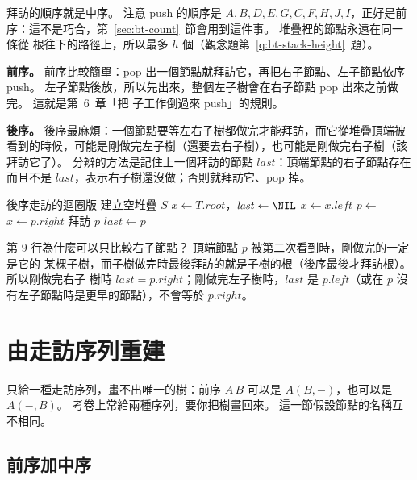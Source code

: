 拜訪的順序就是中序。 注意 push 的順序是 $A, B, D, E, G, C, F, H, J, I$，正好是前
序：這不是巧合，第~\ref{sec:bt-count}~節會用到這件事。 堆疊裡的節點永遠在同一條從
根往下的路徑上，所以最多 $h$ 個（觀念題第~\ref{q:bt-stack-height}~題）。

\textbf{前序。} 前序比較簡單：pop 出一個節點就拜訪它，再把右子節點、左子節點依序 push。
左子節點後放，所以先出來，整個左子樹會在右子節點 pop 出來之前做完。 這就是第~6~章「把
子工作倒過來 push」的規則。

\textbf{後序。} 後序最麻煩：一個節點要等左右子樹都做完才能拜訪，而它從堆疊頂端被
看到的時候，可能是剛做完左子樹（還要去右子樹），也可能是剛做完右子樹（該拜訪它了）。
分辨的方法是記住上一個拜訪的節點 $\mathit{last}$：頂端節點的右子節點存在而且不是
$\mathit{last}$，表示右子樹還沒做；否則就拜訪它、pop 掉。

\begin{pseudo}[label=alg:bt-postorder-iter]{後序走訪的迴圈版}
    \State 建立空堆疊 $S$
    \State $x \gets T.\mathit{root}$，$\mathit{last} \gets \NIL$
            \State {}
            \State $x \gets x.\mathit{left}$
        \EndWhile
        \State $p \gets$  
            \State $x \gets p.\mathit{right}$ 
        \Else
            \State 拜訪 $p$
            \State $\mathit{last} \gets p$
            \State {}
        \EndIf
    \EndWhile
\EndProcedure
\end{pseudo}

第 9 行為什麼可以只比較右子節點？ 頂端節點 $p$ 被第二次看到時，剛做完的一定是它的
某棵子樹，而子樹做完時最後拜訪的就是子樹的根（後序最後才拜訪根）。 所以剛做完右子
樹時 $\mathit{last} = p.\mathit{right}$；剛做完左子樹時，$\mathit{last}$ 是
$p.\mathit{left}$（或在 $p$ 沒有左子節點時是更早的節點），不會等於
$p.\mathit{right}$。

\section{由走訪序列重建}
\label{sec:bt-rebuild}

只給一種走訪序列，畫不出唯一的樹：前序 $A\,B$ 可以是 $A(B, -)$，也可以是
$A(-, B)$。 考卷上常給兩種序列，要你把樹畫回來。 這一節假設節點的名稱互不相同。

\subsection{前序加中序}


